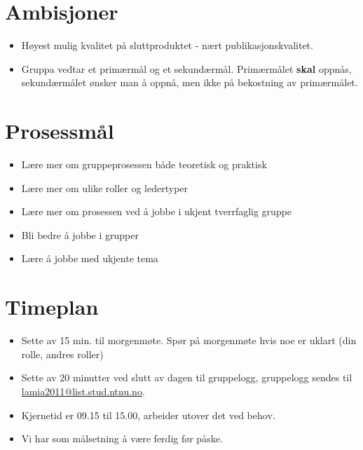\documentclass[a4paper, norsk, 12pt]{report}
\begin{document}
\section*{Ambisjoner}
\begin{itemize}
  \item Høyest mulig kvalitet på sluttproduktet - nært publikasjonskvalitet.
  \item Gruppa vedtar et primærmål og et sekundærmål. Primærmålet \textbf{skal}
    oppnås, sekundærmålet ønsker man å oppnå, men ikke på bekostning av
    primærmålet.
\end{itemize}

\section*{Prosessmål}
\begin{itemize}
\item Lære mer om gruppeprosessen både teoretisk og praktisk
\item Lære mer om ulike roller og ledertyper
\item Lære mer om prosessen ved å jobbe i ukjent tverrfaglig gruppe
\item Bli bedre å jobbe i grupper
\item Lære å jobbe med ukjente tema
\end{itemize}

\section*{Timeplan}
\begin{itemize}
\item Sette av 15 min. til morgenmøte. Spør på morgenmøte hvis noe er uklart (din rolle, andres roller)
\item Sette av 20 minutter ved slutt av dagen til gruppelogg, gruppelogg sendes
  til \\ \url{lamia2011@list.stud.ntnu.no}.
\item Kjernetid er 09.15 til 15.00, arbeider utover det ved behov.
\item Vi har som målsetning å være ferdig før påske.
\end{itemize}

\vspace{3cm}
\makebox[\textwidth][l]{
\makebox[4cm][l] {\hrulefill} \hfill 
\makebox[4cm][l] {\hrulefill} }

\vspace{1cm}
\makebox[\textwidth][l]{
\makebox[4cm][l] {\hrulefill} \hfill 
\makebox[4cm][l] {\hrulefill} }

\vspace{1cm}
\makebox[\textwidth][l]{
\makebox[4cm][l] {\hrulefill}  }
\end{document}

